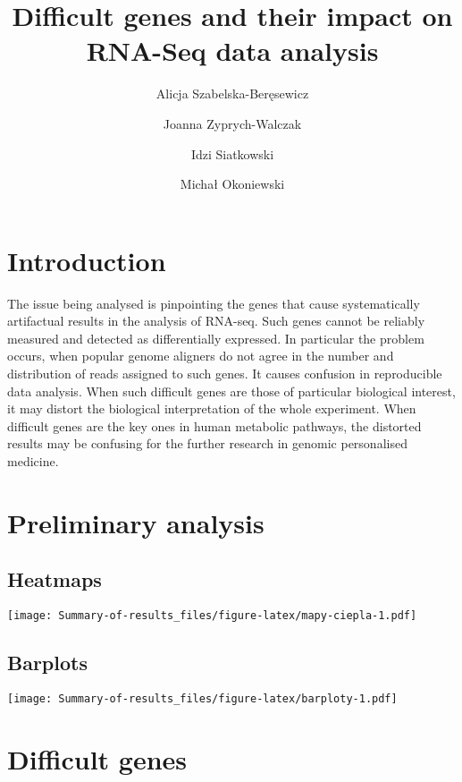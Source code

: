 \documentclass[
  11pt,
]{article}
\title{Difficult genes and their impact on RNA-Seq data analysis}
\author{Alicja Szabelska-Beręsewicz \and Joanna Zyprych-Walczak \and Idzi Siatkowski \and Michał Okoniewski}
\date{}
\begin{document}
\maketitle

{
\setcounter{tocdepth}{2}
\tableofcontents
}
\hypertarget{introduction}{%
\section{Introduction}\label{introduction}}

The issue being analysed is pinpointing the genes that cause systematically artifactual results in the analysis of RNA-seq. Such genes cannot be reliably measured and detected as differentially expressed. In particular the problem occurs, when popular genome aligners do not agree in the number and distribution of reads assigned to such genes. It causes confusion in reproducible data analysis. When such difficult genes are those of particular biological interest, it may distort the biological interpretation of the whole experiment. When difficult genes are the key ones in human metabolic pathways, the distorted results may be confusing for the further research in genomic personalised medicine.

\hypertarget{preliminary-analysis}{%
\section{Preliminary analysis}\label{preliminary-analysis}}

\hypertarget{heatmaps}{%
\subsection{Heatmaps}\label{heatmaps}}

\texttt{[image: Summary-of-results\_files/figure-latex/mapy-ciepla-1.pdf]}

\hypertarget{barplots}{%
\subsection{Barplots}\label{barplots}}

\texttt{[image: Summary-of-results\_files/figure-latex/barploty-1.pdf]}

\hypertarget{difficult_genes}{%
\section{Difficult genes}\label{difficult_genes}}
\end{document}
